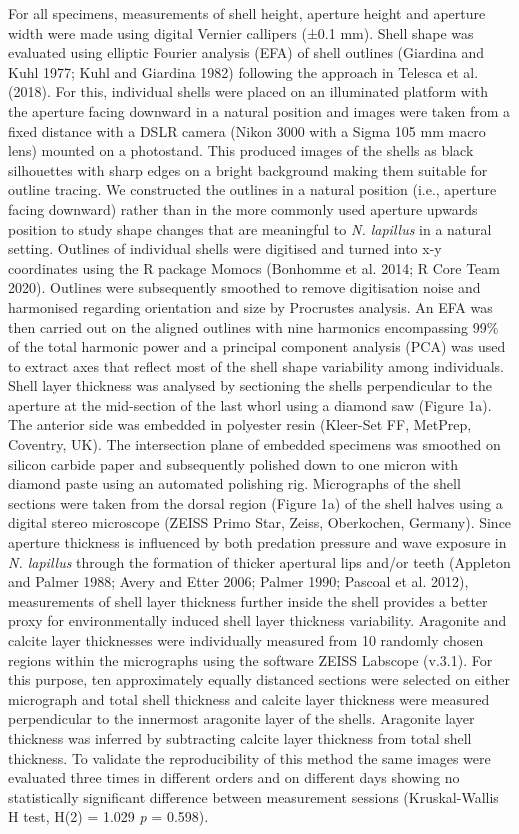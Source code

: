\documentclass[smallextended]{svjour3}       %
\begin{document}
For all specimens, measurements of shell height, aperture height and
aperture width were made using digital Vernier callipers (±0.1 mm).
Shell shape was evaluated using elliptic Fourier analysis (EFA) of shell
outlines (Giardina and Kuhl 1977; Kuhl and Giardina 1982) following the
approach in Telesca et al. (2018). For this, individual shells were
placed on an illuminated platform with the aperture facing downward in a
natural position and images were taken from a fixed distance with a DSLR
camera (Nikon 3000 with a Sigma 105 mm macro lens) mounted on a
photostand. This produced images of the shells as black silhouettes with
sharp edges on a bright background making them suitable for outline
tracing. We constructed the outlines in a natural position (i.e.,
aperture facing downward) rather than in the more commonly used aperture
upwards position to study shape changes that are meaningful to \emph{N.
lapillus} in a natural setting. Outlines of individual shells were
digitised and turned into x-y coordinates using the R package Momocs
(Bonhomme et al. 2014; R Core Team 2020). Outlines were subsequently
smoothed to remove digitisation noise and harmonised regarding
orientation and size by Procrustes analysis. An EFA was then carried out
on the aligned outlines with nine harmonics encompassing 99\% of the
total harmonic power and a principal component analysis (PCA) was used
to extract axes that reflect most of the shell shape variability among
individuals. Shell layer thickness was analysed by sectioning the shells
perpendicular to the aperture at the mid-section of the last whorl using
a diamond saw (Figure 1a). The anterior side was embedded in polyester
resin (Kleer-Set FF, MetPrep, Coventry, UK). The intersection plane of
embedded specimens was smoothed on silicon carbide paper and
subsequently polished down to one micron with diamond paste using an
automated polishing rig. Micrographs of the shell sections were taken
from the dorsal region (Figure 1a) of the shell halves using a digital
stereo microscope (ZEISS Primo Star, Zeiss, Oberkochen, Germany). Since
aperture thickness is influenced by both predation pressure and wave
exposure in \emph{N. lapillus} through the formation of thicker
apertural lips and/or teeth (Appleton and Palmer 1988; Avery and Etter
2006; Palmer 1990; Pascoal et al. 2012), measurements of shell layer
thickness further inside the shell provides a better proxy for
environmentally induced shell layer thickness variability. Aragonite and
calcite layer thicknesses were individually measured from 10 randomly
chosen regions within the micrographs using the software ZEISS Labscope
(v.3.1). For this purpose, ten approximately equally distanced sections
were selected on either micrograph and total shell thickness and calcite
layer thickness were measured perpendicular to the innermost aragonite
layer of the shells. Aragonite layer thickness was inferred by
subtracting calcite layer thickness from total shell thickness. To
validate the reproducibility of this method the same images were
evaluated three times in different orders and on different days showing
no statistically significant difference between measurement sessions
(Kruskal-Wallis H test, H(2) = 1.029 \emph{p} = 0.598).
\end{document}
